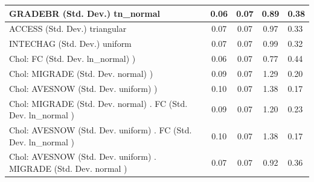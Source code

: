 \begin{table}
\begin{center}
\begin{tabular}{|l|l|c|c|c|l|}
			\hline
			GRADEBR (Std. Dev.) tn_normal &  & 0.06 & 0.07 & 0.89 & 0.38 \\
			\hline
			ACCESS (Std. Dev.) triangular &  & 0.07 & 0.07 & 0.97 & 0.33 \\
			\hline
			INTECHAG (Std. Dev.) uniform &  & 0.07 & 0.07 & 0.99 & 0.32 \\
			\hline
			 Chol: FC (Std. Dev. ln_normal) ) &  & 0.06 & 0.07 & 0.77 & 0.44 \\
			\hline
			 Chol: MIGRADE (Std. Dev. normal) ) &  & 0.09 & 0.07 & 1.29 & 0.20 \\
			\hline
			 Chol: AVESNOW (Std. Dev. uniform) ) &  & 0.10 & 0.07 & 1.38 & 0.17 \\
			\hline
			 Chol: MIGRADE (Std. Dev. normal) . FC (Std. Dev.   ln_normal ) &  & 0.09 & 0.07 & 1.20 & 0.23 \\
			\hline
			 Chol: AVESNOW (Std. Dev. uniform) . FC (Std. Dev.   ln_normal ) &  & 0.10 & 0.07 & 1.38 & 0.17 \\
			\hline
			 Chol: AVESNOW (Std. Dev. uniform) . MIGRADE (Std. Dev.   normal ) &  & 0.07 & 0.07 & 0.92 & 0.36 \\
			\hline
		\end{tabular}
	\end{center}
\end{table}